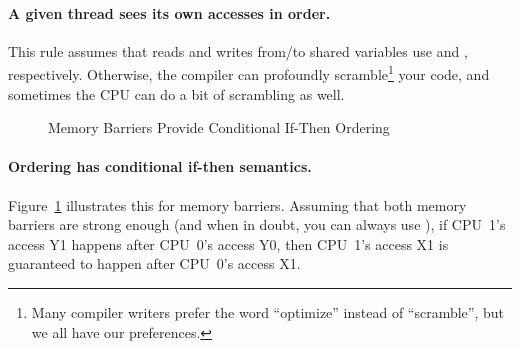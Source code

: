 \paragraph{A given thread sees its own accesses in order.}
This rule assumes that reads and writes from/to shared variables use
 and , respectively.
Otherwise, the compiler can profoundly scramble\footnote{
	Many compiler writers prefer the word ``optimize'' instead of
	``scramble'', but we all have our preferences.}
your code, and sometimes the CPU can do a bit of scrambling as well.

\begin{figure}[htb]
\centering
{}
\caption{Memory Barriers Provide Conditional If-Then Ordering}
\label{fig:memorder:Memory Barriers Provide Conditional If-Then Ordering}
\end{figure}

\paragraph{Ordering has conditional if-then semantics.}
Figure~\ref{fig:memorder:Memory Barriers Provide Conditional If-Then Ordering}
illustrates this for memory barriers.
Assuming that both memory barriers are strong enough (and when in doubt, you
can always use ), if CPU~1's access Y1 happens after CPU~0's
access Y0, then CPU~1's access X1 is guaranteed to happen after CPU~0's
access X1.

